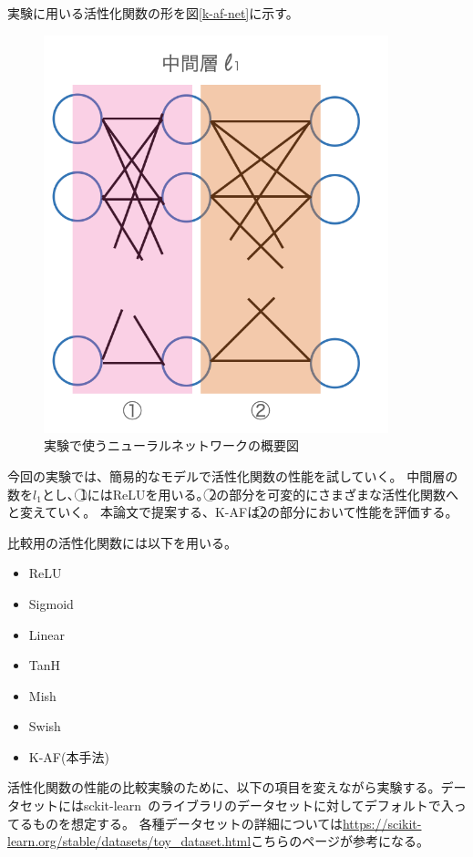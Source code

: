 実験に用いる活性化関数の形を図\ref{k-af-net}に示す。
\begin{figure}[hbtp]
\label{k-af-net}
    \begin{center}
        \includegraphics[width=10cm]{asset/k-af-net.png}
            \caption{実験で使うニューラルネットワークの概要図}
            \label{neural_network1}
    \end{center}
\end{figure}

今回の実験では、簡易的なモデルで活性化関数の性能を試していく。
中間層の数を$ l_1 $とし、\textcircled{\scriptsize 1}にはReLUを用いる。\textcircled{\scriptsize 2}の部分を可変的にさまざまな活性化関数へと変えていく。
本論文で提案する、K-AFは\textcircled{\scriptsize 2}の部分において性能を評価する。

比較用の活性化関数には以下を用いる。
\begin{itemize}
    \setlength{\parskip}{0cm} %
    \setlength{\itemsep}{0cm} %
    \item ReLU
    \item Sigmoid
    \item Linear
    \item TanH
    \item Mish
    \item Swish
    \item K-AF(本手法)
\end{itemize}


活性化関数の性能の比較実験のために、以下の項目を変えながら実験する。データセットにはsckit-learn~\cite{scikit-learn}のライブラリのデータセットに対してデフォルトで入ってるものを想定する。
各種データセットの詳細については\url{https://scikit-learn.org/stable/datasets/toy_dataset.html}こちらのページが参考になる。

